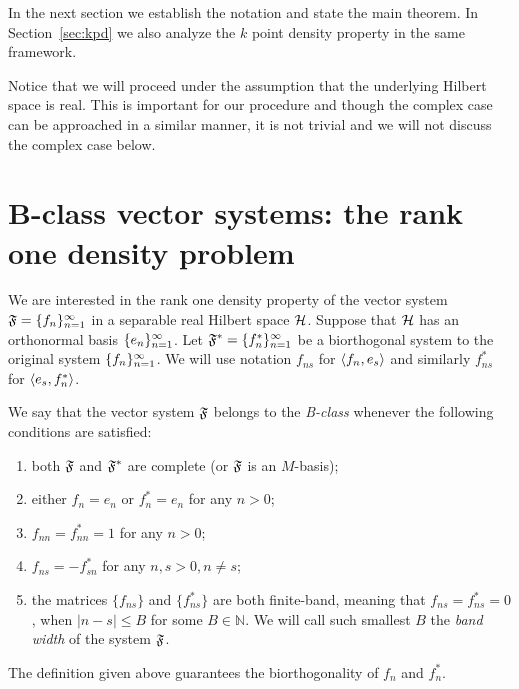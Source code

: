 \documentclass[12pt,oneside,a4paper]{amsart}
\begin{document}
  In the next section we establish the notation and state the main theorem.
  In Section~\ref{sec:kpd} we also analyze the $k$ point density property in the same framework.

  Notice that we will proceed under the assumption that the underlying Hilbert space is real.
  This is important for our procedure and though the complex case can be approached in
    a similar manner, it is not trivial and we will not discuss the complex case below.
\bigskip
\section{B-class vector systems: the rank one density problem}
    \label{fsys2graphs}
    We are interested in the rank one density property of the vector system $\fsys = \seq{f}$
      in a separable real Hilbert space $\cal{H}$.
    Suppose that $\cal{H}$ has an orthonormal basis $\seq{e}$.
    Let $\fstarsys = \{f_n^{*}\}_{n=1}^\infty$ be a biorthogonal system to the original system $\seq{f}$.
    We will use notation $f_{ns}$ for $\inner{f_n}{e_s}$ and similarly $f^*_{ns}$ for $\inner{e_s}{f^*_n}$.
    \begin{definition}
      We say that the vector system $\fsys$ belongs to the \emph{B-class} whenever the following conditions are satisfied:
      \begin{enumerate}[label=\textbf{C\arabic*}]
        \item \label{c1} both $\fsys$ and $\fstarsys$ are complete (or $\fsys$ is an $M$-basis);
        \item \label{c2} either $f_n = e_n$ or $f^*_n = e_n$ for any $n > 0$;
        \item \label{c3} $f_{nn} = f^*_{nn} = 1$ for any $n > 0$;
        \item \label{c4} $f_{ns} = -f^*_{sn}$ for any $n, s > 0, n \neq s$;
        \item \label{c5} the matrices $\{f_{ns}\}$ and $\{f^*_{ns}\}$ are both finite-band,
            meaning that $f_{ns} = f^*_{ns} = 0$, when $\lvert n - s \rvert \leq B$ for some $B \in \mathbb{N}$.
          We will call such smallest $B$ the \emph{band width} of the system $\fsys$.
      \end{enumerate}
    \end{definition}
    \begin{prop}
      The definition given above guarantees the biorthogonality of $f_n$ and $f^*_n$.
    \end{prop}
\end{document}
